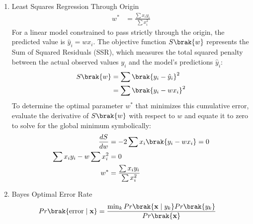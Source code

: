 \begin{enumerate}[label=\thesubsection.\arabic*, ref=\thesubsection.\theenumi]
	\item Least Squares Regression Through Origin
	\begin{align}
		w^* &= \frac{\sum x_i y_i}{\sum x_i^2} \label{eq:DA2025-least_squares}
	\end{align}
	\solution
	For a linear model constrained to pass strictly through the origin, the predicted value is $\hat{y}_i = w x_i$. The objective function $S\brak{w}$ represents the Sum of Squared Residuals (SSR), which measures the total squared penalty between the actual observed values $y_i$ and the model's predictions $\hat{y}_i$:
	\begin{align}
		S\brak{w} &= \sum \brak{y_i - \hat{y}_i}^2
		\\
		&= \sum \brak{y_i - w x_i}^2
	\end{align}
	To determine the optimal parameter $w^*$ that minimizes this cumulative error, evaluate the derivative of $S\brak{w}$ with respect to $w$ and equate it to zero to solve for the global minimum symbolically:
	\begin{align}
		\frac{dS}{dw} &= -2 \sum x_i \brak{y_i - w x_i} = 0
		\\
		\sum x_i y_i - w \sum x_i^2 &= 0
		\\
		w^* &= \frac{\sum x_i y_i}{\sum x_i^2}
	\end{align}
	\item Bayes Optimal Error Rate
	\begin{align}
		Pr\brak{\text{error} \mid \mathbf{x}} &= \frac{\min_k Pr\brak{\mathbf{x} \mid y_k} Pr\brak{y_k}}{Pr\brak{\mathbf{x}}} \label{eq:DA2025-bayes_error}
	\end{align}
	

\end{enumerate}
